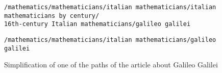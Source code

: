 
\begin{figure}
\centering
\begin{lstlisting}
/mathematics/mathematicians/italian mathematicians/italian mathematicians by century/
16th-century Italian mathematicians/galileo galilei
\end{lstlisting}
\begin{lstlisting}
/mathematics/mathematicians/italian mathematicians/galileo galilei
\end{lstlisting}

\caption[Simplification of an article path]{Simplification of one of the paths of the article about Galileo Galilei}
\label{fig:galileogalilei}
\end{figure}
